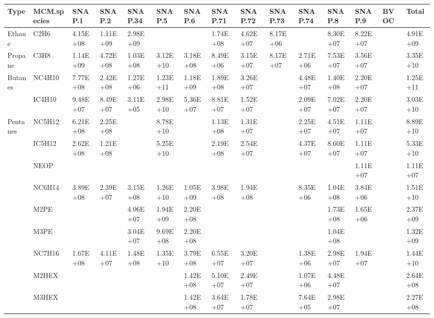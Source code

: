 \tiny
\begin{longtable}{lllllllllllllll}
	\hline \hline
	\textbf{Type} & \textbf{MCM.species} & \textbf{SNAP.1} & \textbf{SNAP.2} & \textbf{SNAP.34} & \textbf{SNAP.5} & \textbf{SNAP.6} & \textbf{SNAP.71} & \textbf{SNAP.72} & \textbf{SNAP.73} & \textbf{SNAP.74} & \textbf{SNAP.8} & \textbf{SNAP.9} & \textbf{BVOC} & \textbf{Total}\\
	\endhead
	\hline
	Ethane & C2H6 & 4.15E+08 & 1.11E+09 & 2.98E+09 &  &  & 1.74E+08 & 4.62E+07 & 8.17E+06 &  & 8.30E+07 & 8.22E+07 &  & 4.91E+09 \\
	\hline Propane & C3H8 & 1.14E+09 & 4.72E+08 & 1.03E+08 & 3.12E+10 & 3.18E+08 & 8.49E+06 & 3.15E+07 & 8.17E+07 & 2.71E+06 & 7.53E+07 & 3.56E+07 &  & 3.35E+10 \\ \hline
	\multirow{2}{*}{Butanes} & NC4H10 & 7.77E+08 & 2.42E+08 & 1.27E+06 & 1.23E+11 & 1.18E+09 & 1.89E+08 & 3.26E+07 &  & 4.48E+07 & 1.40E+08 & 2.20E+07 &  & 1.25E+11 \\
	 & IC4H10 & 9.48E+07 & 8.49E+07 & 3.11E+05 & 2.98E+10 & 5.36E+07 & 8.81E+07 & 1.52E+07 &  & 2.09E+07 & 7.02E+07 & 2.20E+07 &  & 3.03E+10 \\
	\hline \multirow{3}{*}{Pentanes} & NC5H12 & 6.21E+08 & 2.25E+08 &  & 8.78E+10 &  & 1.13E+08 & 1.31E+07 &  & 2.25E+07 & 4.51E+07 & 1.11E+07 &  & 8.89E+10 \\
	 & IC5H12 & 2.62E+08 & 1.21E+08 &  & 5.25E+10 &  & 2.19E+08 & 2.54E+07 &  & 4.37E+07 & 8.60E+07 & 1.11E+07 &  & 5.33E+10 \\
	 & NEOP &  &  &  &  &  &  &  &  &  &  & 1.11E+07 &  & 1.11E+07 \\
	\hline \parbox[t]{2mm}{} & NC6H14 & 3.89E+08 & 2.39E+07 & 3.15E+08 & 1.26E+10 & 1.05E+09 & 3.98E+08 & 1.94E+08 &  & 8.35E+06 & 1.04E+08 & 3.84E+06 &  & 1.51E+10 \\
	 & M2PE &  &  & 4.06E+07 & 1.94E+09 & 2.20E+08 &  &  &  &  & 1.73E+08 & 1.65E+06 &  & 2.37E+09 \\
	 & M3PE &  &  & 3.04E+07 & 9.69E+08 & 2.20E+08 &  &  &  &  & 1.04E+08 &  &  & 1.32E+09 \\
	 & NC7H16 & 1.67E+08 & 4.11E+07 & 1.48E+08 & 1.35E+10 & 3.79E+08 & 6.55E+07 & 3.20E+07 &  & 1.38E+06 & 2.98E+07 & 1.94E+07 &  & 1.44E+10 \\
	 & M2HEX &  &  &  &  & 1.42E+08 & 5.10E+07 & 2.49E+07 &  & 1.07E+06 & 4.48E+07 &  &  & 2.64E+08 \\
	 & M3HEX &  &  &  &  & 1.42E+08 & 3.64E+07 & 1.78E+07 &  & 7.64E+05 & 2.98E+07 &  &  & 2.27E+08 \\

\end{longtable}
